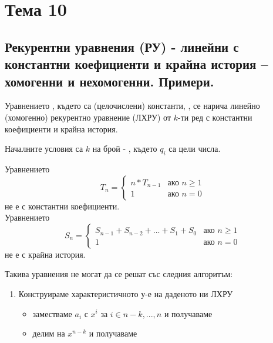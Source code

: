 \section{Тема 10}

\subsection{Рекурентни уравнения (РУ) - линейни с константни коефициенти и крайна история – 
хомогенни и нехомогенни. Примери.}

\begin{definition}
    Уравнението , където 
     са (целочислени) константи, , се нарича линейно 
    (хомогенно) рекурентно уравнение (ЛХРУ) от \(k\)-ти ред с константни коефициенти и крайна история.
\end{definition}

Началните условия са \(k\) на брой - , където \(q_i\) са цели числа.

\begin{note}
    Уравнението 
    \begin{equation*}
        T_n = 
        \begin{cases}
            n * T_{n - 1} & \text{ако \(n \ge 1\)} \\
            1 & \text{ако \(n = 0\)}
        \end{cases}
    \end{equation*}
    не е с константни коефициенти. \\
    Уравнението 
    \begin{equation*}
        S_n = 
        \begin{cases}
            S_{n - 1} + S_{n - 2} + ... + S_1 + S_0 & \text{ако \(n \ge 1\)} \\
            1 & \text{ако \(n = 0\)}
        \end{cases}
    \end{equation*}
    не е с крайна история. 
\end{note}

Такива уравнения не могат да се решат със следния алгоритъм:
\begin{enumerate}
    \item Конструираме характеристичното у-е на даденото ни ЛХРУ
    \begin{itemize}
        \item заместваме \(a_i\) с \(x^i\) за \(i \in {n - k, ..., n}\) и получаваме \\
        \item делим на \(x^{n - k}\) и получаваме 
    \end{itemize}
\end{enumerate}

